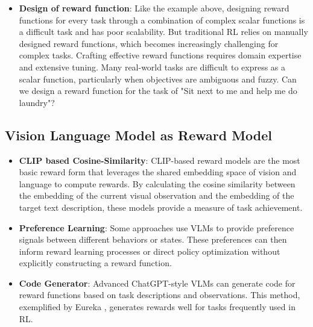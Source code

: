 \documentclass[11pt]{article}
\begin{document}
\begin{itemize}
    \textbf{Penalty Terms}: Discourage undesirable behaviors such as joint limit violations and foot slippage:
    \begin{equation}
    R_{penalty} = -\lambda_1 \sum_{i=1}^{n_{joints}} \mathbb{I}(q_i \notin [q_{i,min}, q_{i,max}]) - \lambda_2 \sum_{j=1}^{n_{feet}} ||\mathbf{v}_{slip,j}||
    \end{equation}
    where $\mathbb{I}(\cdot)$ is the indicator function, $q_{i,min}$ and $q_{i,max}$ are joint limits, $\mathbf{v}_{slip,j}$ is the slip velocity of the $j$-th foot, and $\lambda_1$, $\lambda_2$ are penalty weights.
    
    
    \item \textbf{Design of reward function}: Like the example above, designing reward functions for every task through a combination of complex scalar functions is a difficult task and has poor scalability. But traditional RL relies on manually designed reward functions, which becomes increasingly challenging for complex tasks. Crafting effective reward functions requires domain expertise and extensive tuning. Many real-world tasks are difficult to express as a scalar function, particularly when objectives are ambiguous and fuzzy. Can we design a reward function for the task of "Sit next to me and help me do laundry"?
\end{itemize}

\subsection{Vision Language Model as Reward Model}
\begin{itemize}
    \item \textbf{CLIP based Cosine-Similarity}: CLIP-based reward models are the most basic reward form that leverages the shared embedding space of vision and language to compute rewards. By calculating the cosine similarity between the embedding of the current visual observation and the embedding of the target text description, these models provide a measure of task achievement.
    
    \item \textbf{Preference Learning}: Some approaches use VLMs to provide preference signals between different behaviors or states. These preferences can then inform reward learning processes or direct policy optimization without explicitly constructing a reward function.
    
    \item \textbf{Code Generator}: Advanced ChatGPT-style VLMs can generate code for reward functions based on task descriptions and observations. This method, exemplified by Eureka \cite{eureka}, generates rewards well for tasks frequently used in RL.
\end{itemize}
\end{document}
